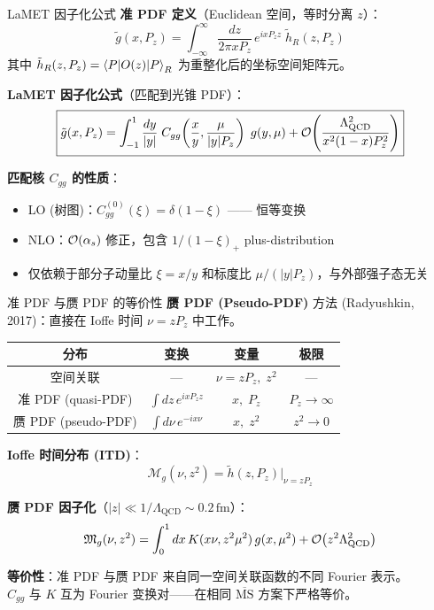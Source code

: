 \documentclass[10pt,aspectratio=169]{beamer}
\newcommand{\msbar}{\overline{\mathrm{MS}}}
\newcommand{\lqcd}{\Lambda_{\mathrm{QCD}}}
\newcommand{\alphas}{\alpha_s}
\newcommand{\fm}{\,\mathrm{fm}}
\newcommand{\Pz}{P_z}
\begin{document}
\begin{frame}{LaMET 因子化公式}
\small
\textbf{准 PDF 定义}（Euclidean 空间，等时分离 $z$）：
\begin{equation}
  \boxed{
  \tilde{g}(x, \Pz) = \int_{-\infty}^{\infty} \frac{dz}{2\pi x\Pz}\,
  e^{i x \Pz z}\; \tilde{h}_R(z, \Pz)
  }
\end{equation}
其中 $\tilde{h}_R(z,\Pz) = \braket{P|O(z)|P}_R$ 为重整化后的坐标空间矩阵元。

\textbf{LaMET 因子化公式}（匹配到光锥 PDF）：
\begin{equation}
  \boxed{
  \tilde{g}(x, \Pz) = \int_{-1}^{1} \frac{dy}{|y|}\;
  C_{gg}\!\left(\frac{x}{y}, \frac{\mu}{|y|\Pz}\right)\;
  g(y, \mu)
  + \order{\frac{\lqcd^2}{x^2(1-x)\Pz^2}}
  }
\end{equation}

\textbf{匹配核 $C_{gg}$ 的性质}：
\begin{itemize}
  \item LO (树图)：$C_{gg}^{(0)}(\xi) = \delta(1-\xi)$ —— 恒等变换
  \item NLO：$\order{\alphas}$ 修正，包含 $1/(1-\xi)_+$ plus-distribution
  \item 仅依赖于部分子动量比 $\xi = x/y$ 和标度比 $\mu/(|y|\Pz)$，与外部强子态无关
\end{itemize}
\end{frame}

\begin{frame}{准 PDF 与赝 PDF 的等价性}
\small
\textbf{赝 PDF (Pseudo-PDF)} 方法 (Radyushkin, 2017)：直接在 Ioffe 时间 $\nu = z\Pz$ 中工作。

\begin{center}
\begin{tabular}{c|c|c|c}
  \toprule
  \textbf{分布} & \textbf{变换} & \textbf{变量} & \textbf{极限} \\
  \midrule
  空间关联 & — & $\nu = z\Pz,\; z^2$ & — \\
  准 PDF (quasi-PDF) & $\int dz\, e^{i x \Pz z}$ & $x,\; \Pz$ & $\Pz \to \infty$ \\
  赝 PDF (pseudo-PDF) & $\int d\nu\, e^{-i x \nu}$ & $x,\; z^2$ & $z^2 \to 0$ \\
  \bottomrule
\end{tabular}
\end{center}

\textbf{Ioffe 时间分布 (ITD)}：
\begin{equation}
  \mathcal{M}_g(\nu, z^2) = \tilde{h}(z, \Pz)\big|_{\nu = z\Pz}
\end{equation}

\textbf{赝 PDF 因子化}（$|z| \ll 1/\lqcd \sim 0.2\fm$）：
\begin{equation}
  \mathfrak{M}_g(\nu, z^2) = \int_0^1 dx\, K(x\nu, z^2\mu^2)\, g(x,\mu^2) + \order{z^2\lqcd^2}
\end{equation}

\textbf{等价性}：准 PDF 与赝 PDF 来自同一空间关联函数的不同 Fourier 表示。\\
$C_{gg}$ 与 $K$ 互为 Fourier 变换对——在相同 $\msbar$ 方案下严格等价。
\end{frame}
\end{document}
